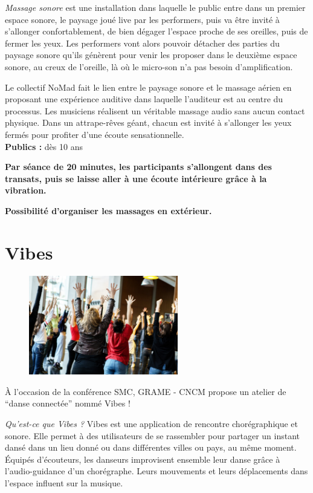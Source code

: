 \documentclass[fontsize=12pt]{scrartcl} %
\numberwithin{equation}{section} %
\numberwithin{table}{section} %
\begin{document}
\textit{Massage sonore} est une installation dans laquelle le public entre dans un premier espace sonore, le paysage joué live par les performers, puis va être invité à s'allonger confortablement, de bien dégager l'espace proche de ses oreilles, puis de fermer les yeux. Les performers vont alors pouvoir détacher des parties du paysage sonore qu'ils génèrent pour venir les proposer dans le deuxième espace sonore, au creux de l'oreille, là où le micro-son n'a pas besoin d'amplification.

Le collectif NoMad fait le lien entre le paysage sonore et le massage aérien en proposant une expérience auditive dans laquelle l'auditeur est au centre du processus. Les musiciens réalisent un véritable massage audio sans aucun contact physique. Dans un attrape-rêves géant, chacun est invité à s'allonger les yeux fermés pour profiter d'une écoute sensationnelle.\\

\noindent
\textbf{Publics :} dès 10 ans

\noindent
\textbf{Par séance de 20 minutes, les participants s'allongent  dans des transats, puis se laisse aller à une écoute intérieure grâce à la vibration.}

\noindent
\textbf{Possibilité d'organiser les massages en extérieur.}

\pagebreak

\section{Vibes}
\label{app:vibes}

\begin{figure}
\centering
\includegraphics[width=6.5cm]{img/vibes}
\label{fig:vibes}
\end{figure}

À l'occasion de la conférence SMC, GRAME - CNCM propose un atelier de ``danse connectée'' nommé Vibes !

\textit{Qu'est-ce que Vibes ?}
Vibes est une application de rencontre chorégraphique et sonore. Elle permet à des utilisateurs de se rassembler pour partager un instant dansé dans un lieu donné ou dans différentes villes ou pays, au même moment. Équipés d'écouteurs, les danseurs improvisent ensemble leur danse grâce à l'audio-guidance d'un chorégraphe. Leurs mouvements et leurs déplacements dans l'espace influent sur la musique.
\end{document}
